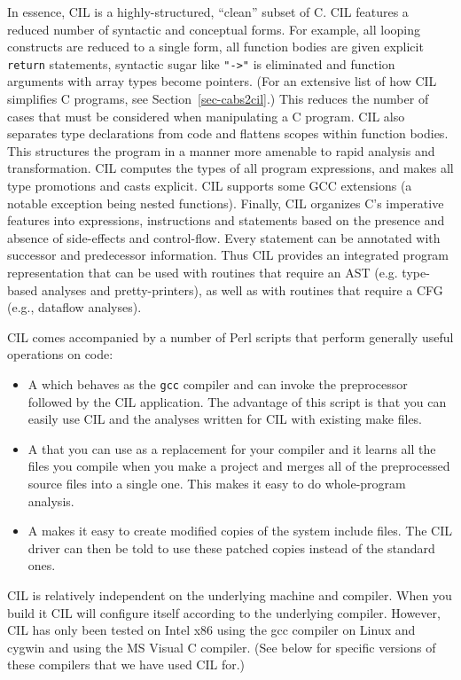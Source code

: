 \documentclass[letterpaper]{article}
\def\secref#1{Section~\ref{sec-#1}}
\def\t#1{{\tt #1}}
\begin{document}
 In essence, CIL is a highly-structured, ``clean'' subset of C. CIL features a
reduced number of syntactic and conceptual forms. For example, all looping
constructs are reduced to a single form, all function bodies are given
explicit {\tt return} statements, syntactic sugar like {\tt "->"} is
eliminated and function arguments with array types become pointers. (For an
extensive list of how CIL simplifies C programs, see \secref{cabs2cil}.)
This reduces the number of cases that must be considered when manipulating a C
program. CIL also separates type declarations from code and flattens scopes
within function bodies. This structures the program in a manner more amenable
to rapid analysis and transformation. CIL computes the types of all program
expressions, and makes all type promotions and casts explicit. CIL supports
some GCC extensions (a notable exception being nested functions).
Finally, CIL organizes C's imperative features into expressions, instructions
and statements based on the presence and absence of side-effects and
control-flow. Every statement can be annotated with successor and predecessor
information. Thus CIL provides an integrated program representation that can
be used with routines that require an AST (e.g. type-based analyses and
pretty-printers), as well as with routines that require a CFG (e.g., dataflow
analyses).

 CIL comes accompanied by a number of Perl scripts that perform generally
useful operations on code:
\begin{itemize}
\item A  which behaves as the \t{gcc} compiler and can invoke the preprocessor followed by the CIL
application. The advantage of this script is that you can easily use CIL and
the analyses written for CIL with existing make files.
\item A  that you can use as a
replacement for your compiler and it learns all the files you compile when you
make a project and merges all of the preprocessed source files into a single
one. This makes it easy to do whole-program analysis.
\item A  makes it easy to create modified
copies of the system include files. The CIL driver can then be told to use
these patched copies instead of the standard ones.
\end{itemize}


CIL is relatively independent on the underlying machine and compiler. When
you build it CIL will configure itself according to the underlying compiler.
However, CIL has only been tested on Intel x86 using the gcc compiler on Linux
and cygwin and using the MS Visual C compiler. (See below for specific
versions of these compilers that we have used CIL for.)
\end{document}
